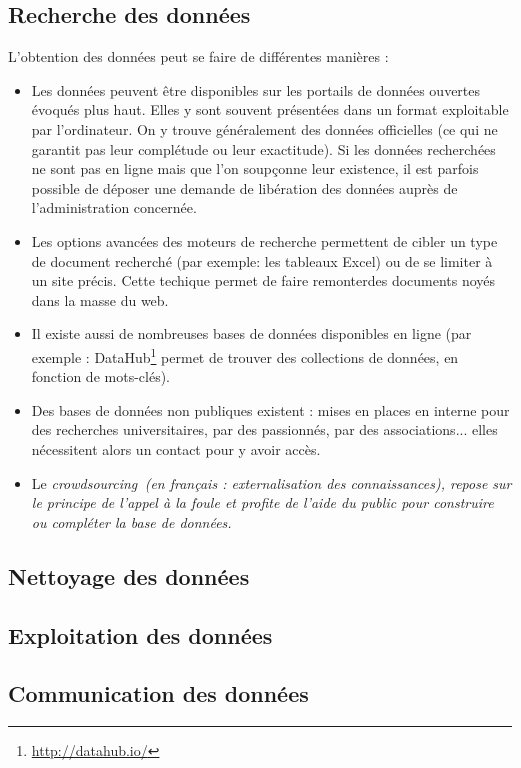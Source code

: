 \subsection{Recherche des données}
L'obtention des données peut se faire de différentes manières :
\begin{itemize}
\item Les données peuvent être disponibles sur les portails de données ouvertes évoqués 
plus haut. Elles y sont souvent présentées dans un format exploitable par l'ordinateur. 
On y trouve généralement des données officielles (ce qui ne garantit pas leur 
complétude ou leur exactitude). Si les données recherchées ne sont pas en ligne mais 
que l'on soupçonne leur existence, il est parfois possible de déposer une demande de \og libération des données \fg auprès de l'administration concernée.
\item Les options avancées des moteurs de recherche permettent de cibler un type de 
document recherché (par exemple: les tableaux Excel) ou de se limiter à un site précis. 
Cette techique permet de faire \og remonter\fg des documents noyés dans la masse du web.
\item Il existe aussi de nombreuses bases de données disponibles en ligne (par exemple : DataHub\footnote{\url{http://datahub.io/}} permet de trouver des collections de données, en fonction de mots-clés).
\item Des bases de données non publiques existent : mises en places en interne pour des recherches universitaires, par des passionnés, par des associations... elles nécessitent alors un contact pour y avoir accès.
\item Le \em crowdsourcing\em\, (en français : externalisation des connaissances), repose sur le principe de \og l'appel à la foule \fg et profite de l'aide du public pour
construire ou compléter la base de données.
\end{itemize}

\subsection{Nettoyage des données}

\subsection{Exploitation des données}


\subsection{Communication des données}


